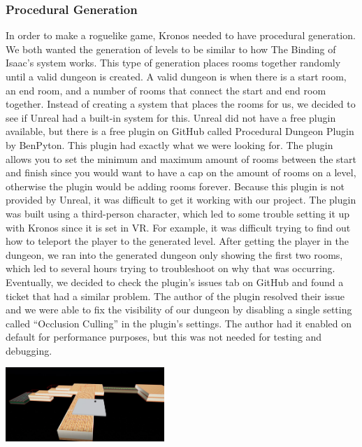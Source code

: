 \documentclass{sigchi}
\begin{document}
\subsubsection*{Procedural Generation}
In order to make a roguelike game, Kronos needed to have procedural generation. We both wanted the generation of levels to be similar to how The Binding of Isaac's \cite{isaac} system works. This type of generation places rooms together randomly until a valid dungeon is created. A valid dungeon is when there is a start room, an end room, and a number of rooms that connect the start and end room together. Instead of creating a system that places the rooms for us, we decided to see if Unreal had a built-in system for this. Unreal did not have a free plugin available, but there is a free plugin on GitHub called Procedural Dungeon Plugin by BenPyton. This plugin had exactly what we were looking for. The plugin allows you to set the minimum and maximum amount of rooms between the start and finish since you would want to have a cap on the amount of rooms on a level, otherwise the plugin would be adding rooms forever. Because this plugin is not provided by Unreal, it was difficult to get it working with our project. The plugin was built using a third-person character, which led to some trouble setting it up with Kronos since it is set in VR. For example, it was difficult trying to find out how to teleport the player to the generated level. After getting the player in the dungeon, we ran into the generated dungeon only showing the first two rooms, which led to several hours trying to troubleshoot on why that was occurring. Eventually, we decided to check the plugin's issues tab on GitHub and found a ticket that had a similar problem. The author of the plugin resolved their issue and we were able to fix the visibility of our dungeon by disabling a single setting called ``Occlusion Culling'' in the plugin's settings. The author had it enabled on default for performance purposes, but this was not needed for testing and debugging.
\begin{center}
    \includegraphics[width=0.45\textwidth]{dungeon.png}
    \label{fig:Sprites}
\end{center}
\end{document}
